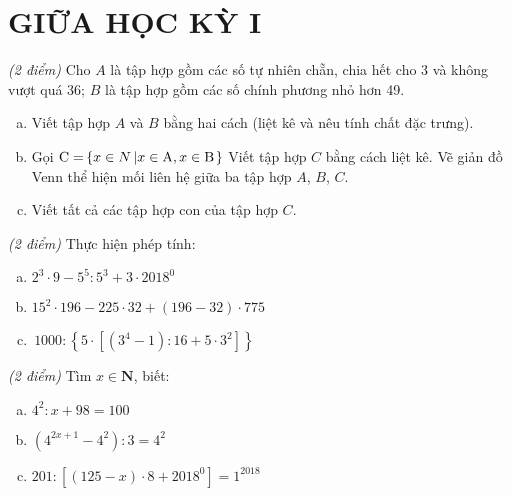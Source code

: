 \section{GIỮA HỌC KỲ I}
\setcounter{ex}{0}
\begin{ex}  \textit{(2 điểm)} Cho $A$ là tập hợp gồm các số tự nhiên chẵn, chia hết cho 3 và không vượt quá 36;  $B$ là tập hợp gồm các số chính phương nhỏ hơn 49. 
\begin{enumerate} [a)]
\item Viết tập hợp $A$ và $B$ bằng hai cách (liệt kê và nêu tính chất đặc trưng).
\item  Gọi ${\rm{C = }}\left\{ {x \in N\left| {x \in {\rm{A}},x \in {\rm{B}}} \right.} \right\}$
Viết tập hợp $C$ bằng cách liệt kê. Vẽ giản đồ Venn thể hiện mối liên hệ giữa ba tập hợp $A$, $B$, $C$.
\item Viết tất cả các tập hợp con của tập hợp $C$.

\end{enumerate}
\end{ex}     \begin{ex} \textit{(2 điểm)} Thực hiện phép tính:
\begin{enumerate} [a)]
\item ${2^3} \cdot 9 - {5^5}:{5^3} + 3 \cdot {2018^0}$
\item ${15^2} \cdot 196 - 225 \cdot 32 + \left( {196 - 32} \right) \cdot 775$
\item $\,1000:\left\{ {5 \cdot \left[ {\left( {{3^4} - 1} \right):16 + 5 \cdot {3^2}} \right]} \right\}$

\end{enumerate}
\end{ex}     \begin{ex} \textit{(2 điểm)} Tìm $x \in \mathbf{N}$, biết:
 \begin{enumerate}[a)]
\item ${4^2}:x + 98 = 100$
\item	$\left( {{4^{2x + 1}} - {4^2}} \right):3 = {4^2}$ 
\item	$201:\left[ {\left( {125 - x} \right) \cdot 8 + {{2018}^0}} \right] = {1^{2018}}$


\end{enumerate}
\end{ex}

